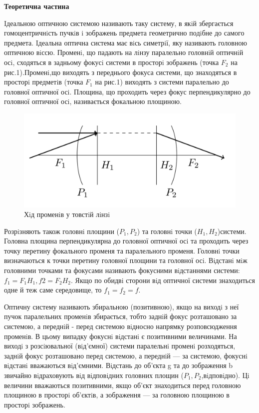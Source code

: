 \begin{center}
    \Large{\textbf{Теоретична частина}}    
\end{center}

\vspace{1mm}

Iдеальною оптичною системою називають таку систему, в якiй збергається гомоцентричнiсть пучкiв i
зображень предмета геометрично подiбне до самого предмета. Iдеальна оптична система має вiсь симетрiї,
яку називають головною оптичною вiссю. Променi, що падають на лiнзу паралельно головнiй оптичнiй
осi, сходяться в задньому фокусi системи в просторi зображень (точка $F_2$ на рис.1).Променi,що виходять з
переднього фокуса системи, що знаходяться в просторi предметiв (точка $F_1$ на рис.1) виходять з системи
паралельно до головної оптичної осi. Площина, що проходить через фокус перпендикулярно
до головної оптичної осi, називається фокальною площиною.

\begin{figure}    
    \centering
    \includegraphics[width=.5\textwidth]{assets/1.png}
    \caption{Хiд променiв у товстiй лiнзi}
\end{figure}

Розрiзняють також головнi площини ($P_1,P_2$) та головнi точки ($H_1, H_2$)системи. Головна площина перпендикулярна до
головної оптичної осi та проходить через точку перетину фокального променя та паралельного променя. Головнi точки
визначаються к точки перетину головної площини та головної осi. Вiдстанi мiж головними точками та фокусами називають
фокусними вiдстаннями системи: $f_1 = F_1H_1, f2 = F_2H_2$. 
Якщо по обидвi сторони вiд оптичної системи знаходиться одне й теж саме середовище, то $f_1 = f_2 = f$.

Оптичну систему називають збиральною (позитивною), якщо на виходi з неї пучок паралельних променiв
збирається, тобто заднiй фокус розташовано за системою, а переднiй - перед системою вiдносно
напрямку розповсюдження променiв. В цьому випадку фокуснi вiдстанi є позитивними величинами. На
виходi з розсiювальної (вiд’ємної) системи паралельнi променi розходяться, заднiй фокус розташовано 
перед системою, а переднiй — за системою, фокуснi вiдстанi вважаються вiд’ємними. Вiдстань до об’єкта g 
та до зображення b звичайно вiдраховують вiд вiдповiдних головних площин ($P_1, P_2$,вiдповiдно). 
Цi величини вважаються позитивними, якщо об’єкт знаходиться перед головною площиною в просторi об’єктiв,
а зображення — за головною площиною в просторi зображень.

